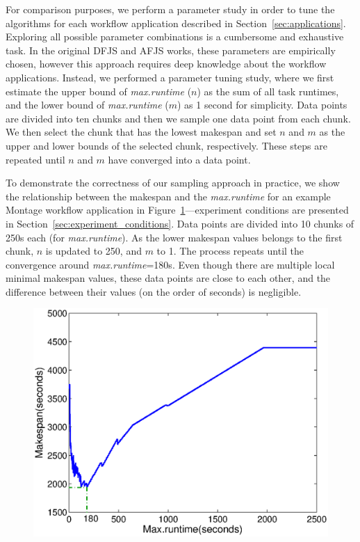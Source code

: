 For comparison purposes, we perform a parameter study in order to tune the algorithms for each workflow application described in Section~\ref{sec:applications}. Exploring all possible parameter combinations is a cumbersome and exhaustive task. In the original DFJS and AFJS works, these parameters are empirically chosen, however this approach requires deep knowledge about the workflow applications. Instead, we performed a parameter tuning study, where we first estimate the upper bound of \emph{max.runtime} ($n$) as the sum of all task runtimes, and the lower bound of \emph{max.runtime} ($m$) as 1 second for simplicity. Data points are divided into ten chunks and then we sample one data point from each chunk. We then select the chunk that has the lowest makespan and set $n$ and $m$ as the upper and lower bounds of the selected chunk, respectively. These steps are repeated until $n$ and $m$ have converged into a data point.


To demonstrate the correctness of our sampling approach in practice, we show the relationship between the makespan and the \emph{max.runtime} for an example Montage workflow application in Figure~\ref{fig:evaluation_dfjs_montage}---experiment conditions are presented in Section~\ref{sec:experiment_conditions}. Data points are divided into 10 chunks of 250s each (for \emph{max.runtime}). As the lower makespan values belongs to the first chunk, $n$ is updated to 250, and $m$ to 1. The process repeats until the convergence around \emph{max.runtime}=180s. Even though there are multiple local minimal makespan values, these data points are close to each other, and the difference between their values (on the order of seconds) is negligible.

\begin{figure}[!htb]
	\centering
	\includegraphics[width=.9\linewidth]{figures/balance/figure19.eps}
	\label{fig:evaluation_dfjs_montage}
\end{figure}

